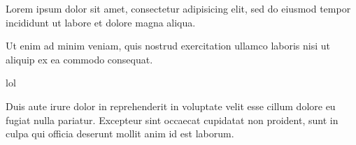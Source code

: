 \documentclass{article}
\begin{document}
Lorem ipsum dolor sit amet, consectetur adipisicing elit, sed do eiusmod
tempor incididunt ut labore et dolore magna aliqua.

\begin{nodetreeenv}
Ut enim ad minim veniam, quis nostrud exercitation ullamco laboris nisi
ut aliquip ex ea commodo consequat.

lol
\end{nodetreeenv}

Duis aute irure dolor in reprehenderit in voluptate velit esse cillum
dolore eu fugiat nulla pariatur. Excepteur sint occaecat cupidatat non
proident, sunt in culpa qui officia deserunt mollit anim id est laborum.
\end{document}
